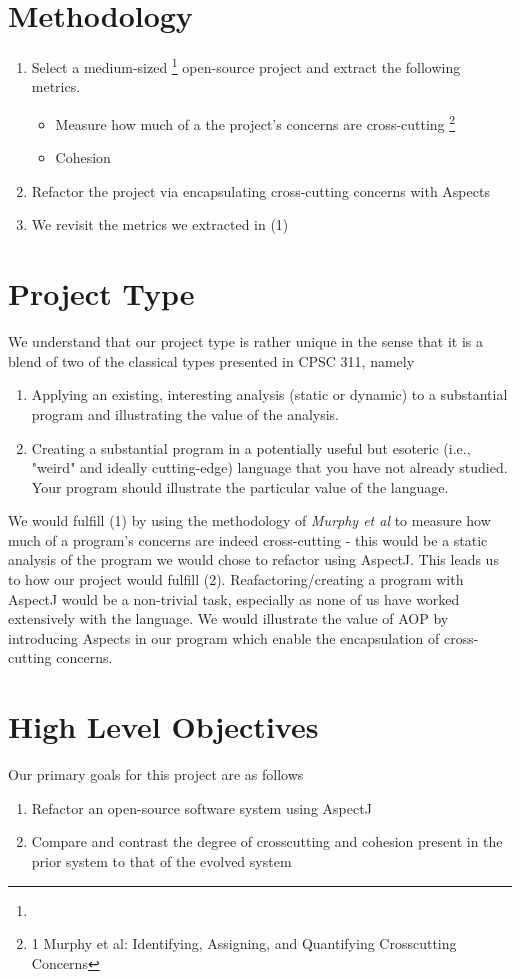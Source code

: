 \documentclass[sigconf]{acmart}
\begin{document}
\section{Methodology}
\begin{enumerate}
    \item Select a medium-sized \footnote{ } open-source project and extract the following metrics.
    \begin{itemize}
    \item Measure how much of a the project's concerns are cross-cutting \footnote{1 Murphy et al: Identifying, Assigning, and Quantifying Crosscutting Concerns}
    \item Cohesion
\end{itemize}
    \item Refactor the project via encapsulating cross-cutting concerns with Aspects
    \item We revisit the metrics we extracted in (1)
\end{enumerate}

\section{Project Type}
We understand that our project type is rather unique in the sense that it is a blend of two of the classical types presented in CPSC 311, namely
\begin{enumerate}
    \item Applying an existing, interesting analysis (static or dynamic) to a substantial program and illustrating the value of the analysis.
    \item Creating a substantial program in a potentially useful but esoteric (i.e., "weird" and ideally cutting-edge) language that you have not already studied. Your program should illustrate the particular value of the language.
\end{enumerate}
We would fulfill (1) by using the methodology of \textit{Murphy et al} to measure how much of a program's concerns are indeed cross-cutting - this would be a static analysis of the program we would chose to refactor using AspectJ. This leads us to how our project would fulfill (2). Reafactoring/creating a program with AspectJ would be a non-trivial task, especially as none of us have worked extensively with the language. We would illustrate the value of AOP by introducing Aspects in our program which enable the encapsulation of cross-cutting concerns.

\section{High Level Objectives}
Our primary goals for this project are as follows 
\begin{enumerate}
    \item Refactor an open-source software system using AspectJ
    \item Compare and contrast the degree of crosscutting and cohesion present in the prior system to that of the evolved system
\end{enumerate}
\end{document}
